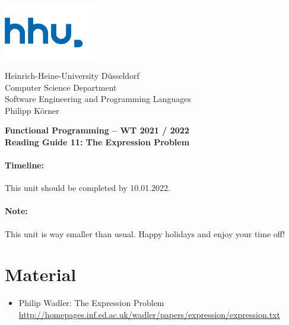\documentclass[11pt,a4paper]{article}
\begin{document}
\begin{minipage}[b]{\textwidth}
	\parbox[t]{5cm}{%
		\includegraphics[width=4cm]{unilogo}
		\hfill
	}
	\parbox[b]{11cm}{%
		Heinrich-Heine-University D\"usseldorf\\
		Computer Science Department\\
		Software Engineering and Programming Languages\\
		Philipp K\"orner
	}
\end{minipage}
\begin{center}
	\bf
	Functional Programming -- WT 2021 / 2022\\
	Reading Guide 11: The Expression Problem
\end{center}

\pagestyle{empty}

\paragraph{Timeline:} This unit should be completed by 10.01.2022.

\paragraph{Note:} This unit is way smaller than usual. Happy holidays and enjoy your time off!

\section{Material} 

\begin{itemize}
\item Philip Wadler: The Expression Problem \url{http://homepages.inf.ed.ac.uk/wadler/papers/expression/expression.txt}
\end{itemize}
\end{document}
